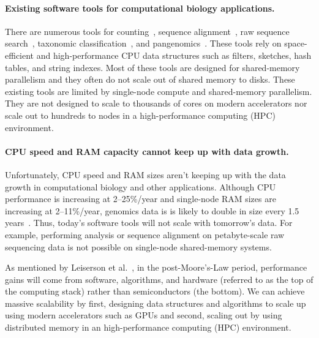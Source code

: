 \paragraph{Existing software tools for computational biology applications.}

There are numerous tools for \kmer counting~\cite{MarccaisKi11,PandeyBJP17a}, sequence alignment~\cite{altschul1990basic,kielbasa2011adaptive,li2018minimap2,schwartz2003human}, raw sequence search~\cite{solomon2016fast,PandeyABFJP18Cell}, taxonomic classification~\cite{wood2014kraken,wood2019improved}, and pangenomics~\cite{garrison2018variation,pandey2021variantstore}. These tools rely on space-efficient and high-performance CPU data structures such as filters, sketches, hash tables, and string indexes. Most of these tools are designed for shared-memory parallelism and they often do not scale out of shared memory to disks.
These existing tools are limited by single-node compute and shared-memory parallelism. They are not designed to scale to thousands of cores on modern accelerators nor scale out to hundreds to nodes in a high-performance computing (HPC) environment.
%


\label{sec:we-need-performance-and-scalability}
\paragraph{CPU speed and RAM capacity cannot keep up with data growth.}
Unfortunately, CPU speed and RAM sizes aren't keeping up with the data growth in computational biology and other applications.
Although CPU performance is increasing at 2--25\%/year and single-node RAM sizes are increasing at 2--11\%/year, genomics data is is likely to double in size every 1.5 years~\cite{kodama2012sequence}.
Thus, today's software tools will not scale with tomorrow's data. For example, performing \kmer analysis or sequence alignment on petabyte-scale raw sequencing data is not possible on single-node shared-memory systems.

As mentioned by Leiserson et al.~\cite{leiserson2020there}, in the post-Moore’s-Law period, performance gains will come from software, algorithms, and hardware (referred to as the top of the computing stack) rather than semiconductors (the bottom). We can achieve massive scalability by first, designing data structures and algorithms to scale up using modern accelerators such as GPUs and second, scaling out by using distributed memory in an high-performance computing (HPC) environment.


